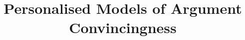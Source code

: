 \documentclass[11pt]{article}
\title{ 
Personalised Models of Argument Convincingness
}
\author{\IEEEauthorblockN{Anonymous}
\IEEEauthorblockA{Anonymous, \\
Anonymous \\
Email: anonymous}
\and
\IEEEauthorblockN{Anonymous}
\IEEEauthorblockA{Anonymous, \\
Anonymous \\
Email: anonymous}
\and
\IEEEauthorblockN{Anonymous}
\IEEEauthorblockA{Anonymous, \\
Anonymous \\
Email: anonymous}
}
\begin{document}
\maketitle

\begin{abstract}
\end{abstract}

%









%


\end{document}
